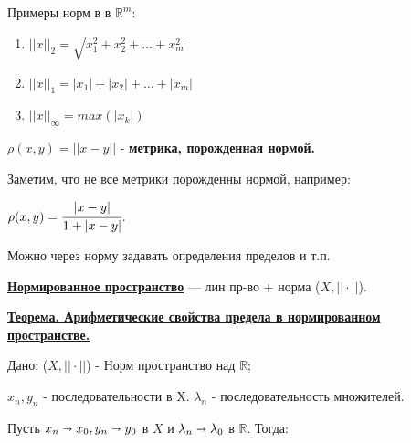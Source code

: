 \documentclass{article}
\newcommand{\deff}[1]{\underline{\textbf{#1}}}
\begin{document}
Примеры норм в в $\mathbb{R}^m$:

\begin{enumerate}
    \item[] $\displaystyle ||x||_2 = \sqrt{x_1^2+x_2^2+\ldots + x_m^2}$ 

    \item[] $\displaystyle ||x||_1 = |x_1|+|x_2| +\ldots + |x_m|$

    \item[] $||x||_\infty = max(|x_k|)$
\end{enumerate}
$\rho(x,y) = ||x-y||$ - \textbf{метрика, порожденная нормой.}

Заметим, что не все метрики порожденны нормой, например:

$\rho(x,y)=\cfrac{|x-y|}{1+|x-y|}$.

Можно через норму задавать определения пределов и т.п.

\deff{Нормированное пространство} --- лин пр-во + норма ($X,||\cdot||$).

    \uline{\textbf{Теорема. Арифметические свойства предела в нормированном пространстве.}}

Дано: ($X,||\cdot||$) - Норм пространство над $\mathbb{R}$;

$x_n, y_n$ - последовательности в X. $\lambda_n$ - последовательность множителей.

Пусть $x_n \shortrightarrow x_0, y_n \shortrightarrow y_0$ в $X$ и $\lambda_n \shortrightarrow \lambda_0$ в $\mathbb{R}$. Тогда:
\end{document}
